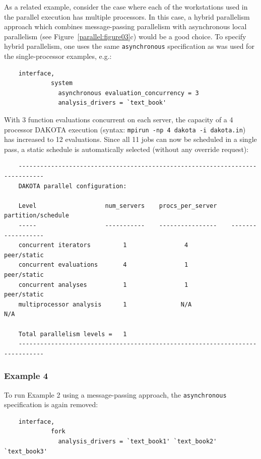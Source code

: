 As a related example, consider the case where each of the workstations
used in the parallel execution has multiple processors. In this case,
a hybrid parallelism approach which combines message-passing
parallelism with asynchronous local parallelism (see
Figure~\ref{parallel:figure03}c) would be a good choice. To specify
hybrid parallelism, one uses the same \texttt{asynchronous}
specification as was used for the single-processor examples, e.g.:
\begin{small}
\begin{verbatim}
    interface,
             system
               asynchronous evaluation_concurrency = 3
               analysis_drivers = `text_book'
\end{verbatim}
\end{small}

With 3 function evaluations concurrent on each server, the capacity of
a 4 processor DAKOTA execution (syntax: \texttt{mpirun -np 4 dakota -i
  dakota.in}) has increased to 12 evaluations. Since all 11 jobs can
now be scheduled in a single pass, a static schedule is automatically
selected (without any override request):
\begin{small}
\begin{verbatim}
    -----------------------------------------------------------------------------
    DAKOTA parallel configuration:

    Level                   num_servers    procs_per_server    partition/schedule
    -----                   -----------    ----------------    ------------------
    concurrent iterators         1                4              peer/static
    concurrent evaluations       4                1              peer/static
    concurrent analyses          1                1              peer/static
    multiprocessor analysis      1               N/A                N/A

    Total parallelism levels =   1
    -----------------------------------------------------------------------------
\end{verbatim}
\end{small}

\subsubsection{Example 4}\label{parallel:spec:multi:example4}

To run Example 2 using a message-passing approach, the
\texttt{asynchronous} specification is again removed:
\begin{small}
\begin{verbatim}
    interface,
             fork
               analysis_drivers = `text_book1' `text_book2' `text_book3'
\end{verbatim}
\end{small}

